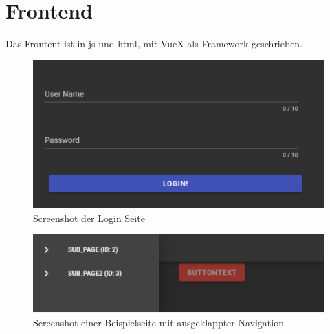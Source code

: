 \section{Frontend}\label{sec:poc:frontend}
Das Frontent ist in \acl{js} und \acs{html}, mit VueX als Framework geschrieben.

\begin{figure}[ht]
  \centering
  \includegraphics[width=\textwidth]{content/hauptteil/umsetzungPoC/frontend/res/screenLogin.pdf}
  \caption{Screenshot der Login Seite}
  \label{fig:frontend:poc:login}
\end{figure}


\begin{figure}[ht]
  \centering
  \includegraphics[width=\textwidth]{content/hauptteil/umsetzungPoC/frontend/res/screenPageNav.pdf}
  \caption{Screenshot einer Beispielseite mit ausgeklappter Navigation}
  \label{fig:frontend:poc:nav}
\end{figure}


